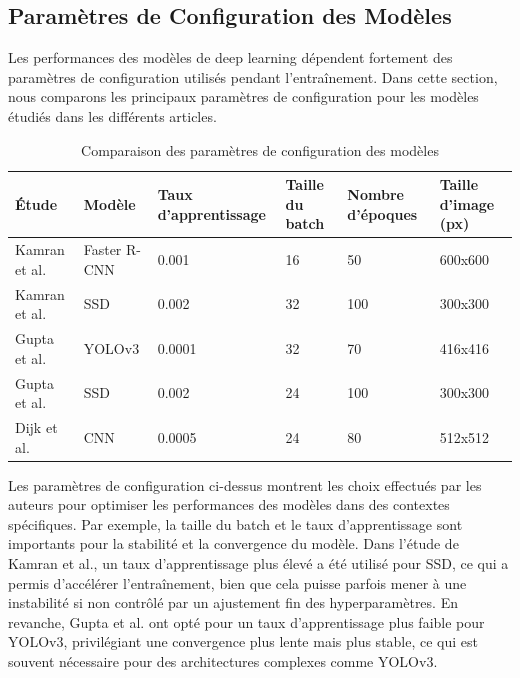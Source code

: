 \subsection{Paramètres de Configuration des Modèles}

Les performances des modèles de deep learning dépendent fortement des paramètres de configuration utilisés pendant l'entraînement. Dans cette section, nous comparons les principaux paramètres de configuration pour les modèles étudiés dans les différents articles.

\begin{table}[H]
    \centering
    \begin{tabularx}{\textwidth}{|p{3cm}|p{2cm}|p{2cm}|p{2cm}|p{3cm}|p{2cm}|}
        \hline
        \textbf{Étude}                  & \textbf{Modèle} & \textbf{Taux d'apprentissage} & \textbf{Taille du batch} & \textbf{Nombre d'époques} & \textbf{Taille d'image (px)} \\ \hline
        Kamran et al. \cite{kamran2020} & Faster R-CNN    & 0.001                         & 16                       & 50                        & 600x600                      \\ \hline
        Kamran et al. \cite{kamran2020} & SSD             & 0.002                         & 32                       & 100                       & 300x300                      \\ \hline
        Gupta et al. \cite{gupta2021}   & YOLOv3          & 0.0001                        & 32                       & 70                        & 416x416                      \\ \hline
        Gupta et al. \cite{gupta2021}   & SSD             & 0.002                         & 24                       & 100                       & 300x300                      \\ \hline
        Dijk et al. \cite{spie2020}     & CNN             & 0.0005                        & 24                       & 80                        & 512x512                      \\ \hline
    \end{tabularx}
    \caption{Comparaison des paramètres de configuration des modèles}
    \label{tab:parametres}
\end{table}

Les paramètres de configuration ci-dessus montrent les choix effectués par les auteurs pour optimiser les performances des modèles dans des contextes spécifiques. Par exemple, la taille du batch et le taux d'apprentissage sont importants pour la stabilité et la convergence du modèle. Dans l'étude de Kamran et al., un taux d'apprentissage plus élevé a été utilisé pour SSD, ce qui a permis d'accélérer l'entraînement, bien que cela puisse parfois mener à une instabilité si non contrôlé par un ajustement fin des hyperparamètres. En revanche, Gupta et al. ont opté pour un taux d'apprentissage plus faible pour YOLOv3, privilégiant une convergence plus lente mais plus stable, ce qui est souvent nécessaire pour des architectures complexes comme YOLOv3.


